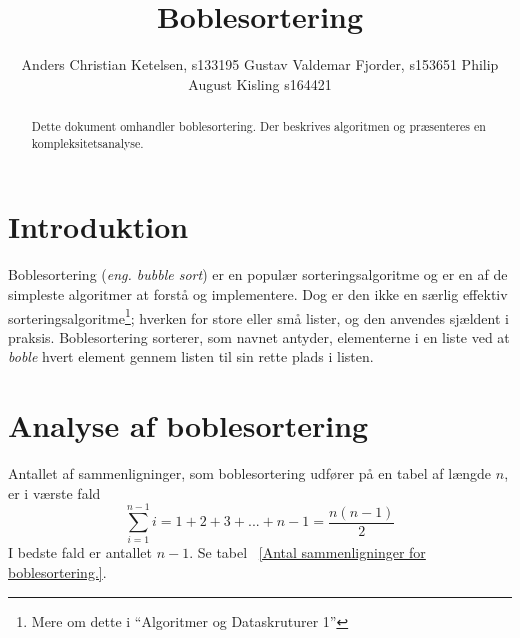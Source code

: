 \documentclass[12pt,a4paper]{article}
\author{Anders Christian Ketelsen, s133195 Gustav Valdemar Fjorder, s153651 Philip August Kisling s164421}
\title{Boblesortering}
\begin{document}
\maketitle
\begin{abstract}
Dette dokument omhandler boblesortering. Der beskrives algoritmen og præsenteres en kompleksitetsanalyse.
\end{abstract}
\section{Introduktion}
Boblesortering (\textsl{eng. bubble sort}) er en populær sorteringsalgoritme og er en af de simpleste algoritmer at forstå og implementere. Dog er den ikke en særlig effektiv sorteringsalgoritme\footnote{Mere om dette i ``Algoritmer og Dataskruturer 1''}; hverken for store eller små lister, og den anvendes sjældent i praksis. Boblesortering sorterer, som navnet antyder, elementerne i en liste ved at \textsl{boble} hvert element gennem listen til sin rette plads i listen.

\section{Analyse af boblesortering}
Antallet af sammenligninger, som boblesortering udfører på en tabel af længde $n$, er i værste fald
\[\sum_{i=1}^{n-1}i=1+2+3+...+n-1=\frac{n(n-1)}{2}\]
I bedste fald er antallet $n-1$. Se tabel ~\ref{Antal sammenligninger for boblesortering.}.
\end{document}
